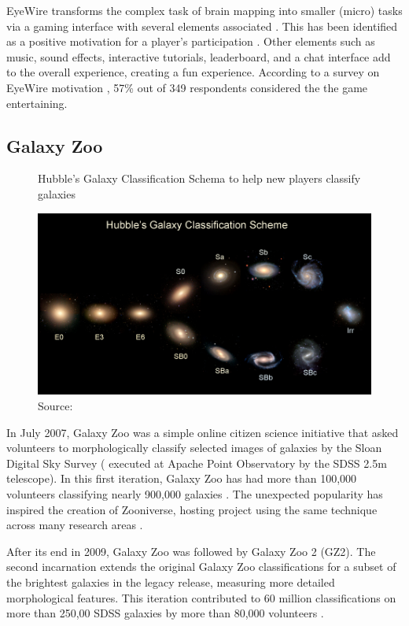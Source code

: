 EyeWire transforms the complex task of brain mapping into smaller (micro) tasks via a gaming interface with several elements associated \cite{seaborn2015gamification}. This has been identified as a positive motivation for a player's participation \cite{tinati2016because}. Other elements such as music, sound effects, interactive tutorials, leaderboard, and a chat interface add to the overall experience, creating a fun experience. According to a survey on EyeWire motivation \cite{tinati2016because}, 57\% out of 349 respondents considered the the game entertaining.

\subsection{Galaxy Zoo}

\begin{figure}[ht]
    \centering
    \caption{Hubble's Galaxy Classification Schema to help new players classify galaxies}
    \includegraphics[width=0.8\linewidth]{images/background/galaxyzoo-training.jpg}
    \caption*{Source: \cite{galaxyzoo2010hubble}}
    \label{fig:galaxyzoo-hubble}
\end{figure}

In July 2007, Galaxy Zoo was a simple online citizen science initiative that asked volunteers to morphologically classify selected images of galaxies by the Sloan Digital Sky Survey (\cite{york2000sloan} executed at Apache Point Observatory by the SDSS 2.5m telescope). In this first iteration, Galaxy Zoo has had more than 100,000 volunteers classifying nearly 900,000 galaxies \cite{lintott2011galaxy}. The unexpected popularity has inspired the creation of Zooniverse, hosting project using the same technique across many research areas \cite{zooniverse2021galaxy}.

After its end in 2009, Galaxy Zoo was followed by Galaxy Zoo 2 (GZ2). The second incarnation extends the original Galaxy Zoo classifications for a subset of the brightest galaxies in the legacy release, measuring more detailed morphological features. This iteration contributed to 60 million classifications on more than 250,00 SDSS galaxies by more than 80,000 volunteers \cite{galaxyzoo22021volunteers}.

